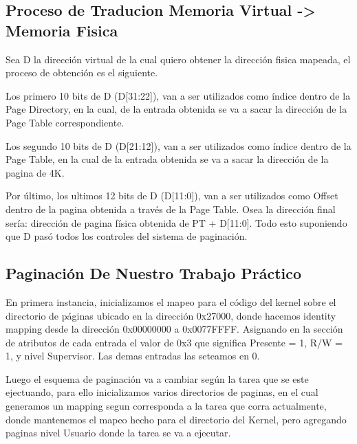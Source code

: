 \subsection{Proceso de Traducion Memoria Virtual -> Memoria Fisica}
\par{ Sea D la dirección virtual de la cual quiero obtener la dirección fisica mapeada, el proceso de obtención es el siguiente.} 
\par {Los primero 10 bits de D (D[31:22]), van a ser utilizados como índice dentro de la Page Directory, en la cual, de la entrada obtenida  se va a sacar la dirección de la Page Table correspondiente.}
\par{ Los segundo 10 bits de D (D[21:12]), van a ser utilizados como índice dentro de la Page Table, en la cual de la entrada obtenida se va a sacar la dirección de la pagina de 4K.}
\par{ Por último, los ultimos 12 bits de D (D[11:0]), van a ser utilizados como Offset dentro de la pagina obtenida a través de la Page Table. Osea la dirección final sería: dirección de pagina física obtenida de PT + D[11:0]. Todo esto suponiendo que D pasó todos los controles del sistema de paginación.}

\subsection{Paginación De Nuestro Trabajo Práctico}
\par{En primera instancia, inicializamos el mapeo para el código del kernel sobre el directorio de páginas ubicado en la dirección 0x27000, donde hacemos identity mapping desde la dirección 0x00000000 a 0x0077FFFF. Asignando en la sección de atributos de cada entrada el valor de 0x3 que significa Presente = 1, R/W = 1, y nivel Supervisor. Las demas entradas las seteamos en 0.}
\par{Luego el esquema de paginación va a cambiar según la tarea que se este ejectuando, para ello inicializamos varios directorios de paginas, en el cual generamos un mapping segun corresponda a la tarea que corra actualmente, donde mantenemos el mapeo hecho para el directorio del Kernel, pero agregando paginas nivel Usuario donde la tarea se va a ejecutar.}



